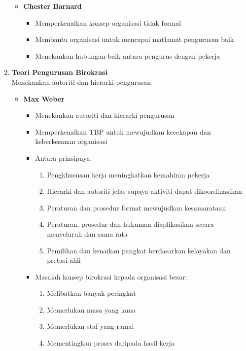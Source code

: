 \documentclass{book}
\begin{document}
\begin{multicols*}{2}
\begin{enumerate}
\begin{itemize}[leftmargin=*]
\begin{itemize}[leftmargin=*]
            \end{itemize}
          \item \textbf{Chester Barnard}
            \begin{itemize}[leftmargin=*]
              \item Memperkenalkan konsep organisasi tidak formal
              \item Membantu organisasi untuk mencapai matlamat pengurusan baik
              \item Menekankan hubungan baik antara pengurus dengan pekerja
            \end{itemize}
        \end{itemize}
      \item \textbf{Teori Pengurusan Birokrasi} \\
        Menekankan autoriti dan hierarki pengurusan
        \begin{itemize}[leftmargin=*]
          \item \textbf{Max Weber}
            \begin{itemize}[leftmargin=*]
              \item Menekankan autoriti dan hierarki pengurusan
              \item Memperkenalkan TBP untuk mewujudkan kecekapan dan keberkesanan organisasi
              \item Antara prinsipnya:
                \begin{enumerate}[label=\arabic*, leftmargin=*]
                  \item Pengkhususan kerja meningkatkan kemahiran pekerja
                  \item Hierarki dan autoriti jelas supaya aktiviti dapat dikoordinasikan
                  \item Peraturan dan prosedur format mewujudkan kesamarataan
                  \item Peraturan, prosedur dan hukuman diaplikasikan secara menyeluruh dan sama rata
                  \item Pemilihan dan kenaikan pangkat berdasarkan kelayakan dan pretasi ahli
                \end{enumerate}
              \item Masalah konsep birokrasi kepada organisasi besar:
                \begin{enumerate}[label=\arabic*, leftmargin=*]
                  \item Melibatkan banyak peringkat
                  \item Memerlukan masa yang lama
                  \item Memerlukan staf yang ramai
                  \item Mementingkan proses daripada hasil kerja
                \end{enumerate}
            \end{itemize}
        \end{itemize}
    \end{enumerate}
    \newpage


\end{multicols*}
\end{document}
